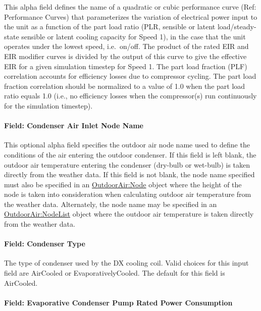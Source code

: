 This alpha field defines the name of a quadratic or cubic performance curve (Ref: Performance Curves) that parameterizes the variation of electrical power input to the unit as a function of the part load ratio (PLR, sensible or latent load/steady-state sensible or latent cooling capacity for Speed 1), in the case that the unit operates under the lowest speed, i.e.~on/off. The product of the rated EIR and EIR modifier curves is divided by the output of this curve to give the effective EIR for a given simulation timestep for Speed 1. The part load fraction (PLF) correlation accounts for efficiency losses due to compressor cycling. The part load fraction correlation should be normalized to a value of 1.0 when the part load ratio equals 1.0 (i.e., no efficiency losses when the compressor(s) run continuously for the simulation timestep).

\paragraph{Field: Condenser Air Inlet Node Name}\label{field-condenser-air-inlet-node-name-3}

This optional alpha field specifies the outdoor air node name used to define the conditions of the air entering the outdoor condenser. If this field is left blank, the outdoor air temperature entering the condenser (dry-bulb or wet-bulb) is taken directly from the weather data. If this field is not blank, the node name specified must also be specified in an \hyperref[outdoorairnode]{OutdoorAir:Node} object where the height of the node is taken into consideration when calculating outdoor air temperature from the weather data. Alternately, the node name may be specified in an \hyperref[outdoorairnodelist]{OutdoorAir:NodeList} object where the outdoor air temperature is taken directly from the weather data.

\paragraph{Field: Condenser Type}\label{field-condenser-type-3}

The type of condenser used by the DX cooling coil. Valid choices for this input field are AirCooled or EvaporativelyCooled. The default for this field is AirCooled.

\paragraph{Field: Evaporative Condenser Pump Rated Power Consumption}\label{field-evaporative-condenser-pump-rated-power-consumption-1}

